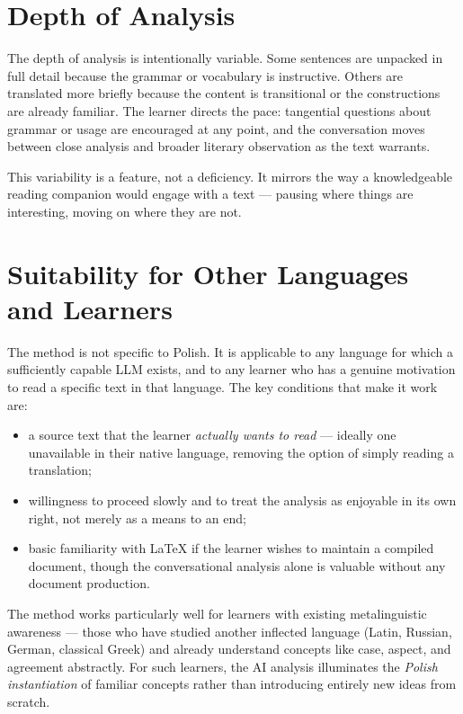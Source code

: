 \section*{Depth of Analysis}

The depth of analysis is intentionally variable. Some sentences
are unpacked in full detail because the grammar or vocabulary is
instructive. Others are translated more briefly because the content
is transitional or the constructions are already familiar. The
learner directs the pace: tangential questions about grammar or
usage are encouraged at any point, and the conversation moves
between close analysis and broader literary observation as the
text warrants.

This variability is a feature, not a deficiency. It mirrors the
way a knowledgeable reading companion would engage with a text ---
pausing where things are interesting, moving on where they are not.

\section*{Suitability for Other Languages and Learners}

The method is not specific to Polish. It is applicable to any
language for which a sufficiently capable LLM exists, and to any
learner who has a genuine motivation to read a specific text in
that language. The key conditions that make it work are:

\begin{itemize}
  \item a source text that the learner \textit{actually wants to read}
    --- ideally one unavailable in their native language, removing
    the option of simply reading a translation;
  \item willingness to proceed slowly and to treat the analysis as
    enjoyable in its own right, not merely as a means to an end;
  \item basic familiarity with \LaTeX{} if the learner wishes to
    maintain a compiled document, though the conversational
    analysis alone is valuable without any document production.
\end{itemize}

The method works particularly well for learners with existing
metalinguistic awareness --- those who have studied another
inflected language (Latin, Russian, German, classical Greek) and
already understand concepts like case, aspect, and agreement
abstractly. For such learners, the AI analysis illuminates the
\textit{Polish instantiation} of familiar concepts rather than
introducing entirely new ideas from scratch.

